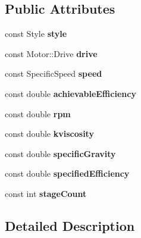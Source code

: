 \subsection*{Public Attributes}
\begin{DoxyCompactItemize}
\item 
\mbox{\label{struct_pump_1_1_input_aca184aaaa02b4e497dccec206f96a0d0}} 
const Style {\bfseries style}
\item 
\mbox{\label{struct_pump_1_1_input_ad14338611cfbf4fc0a0100d668c16f32}} 
const Motor\+::\+Drive {\bfseries drive}
\item 
\mbox{\label{struct_pump_1_1_input_a897d65dbfaddfd286aac0dd0dd88fcb6}} 
const Specific\+Speed {\bfseries speed}
\item 
\mbox{\label{struct_pump_1_1_input_a1c23f68e3a98975481a6f3c67c607a85}} 
const double {\bfseries achievable\+Efficiency}
\item 
\mbox{\label{struct_pump_1_1_input_a90b8725d1063cd958f89ed86ea174ab0}} 
const double {\bfseries rpm}
\item 
\mbox{\label{struct_pump_1_1_input_a7a1be3b4723aa2f49e5fdcbcc274d0c9}} 
const double {\bfseries kviscosity}
\item 
\mbox{\label{struct_pump_1_1_input_a1608eb0dfdd429df17ea7eddc55ccad7}} 
const double {\bfseries specific\+Gravity}
\item 
\mbox{\label{struct_pump_1_1_input_ab3b05426735a030d782ed1e7b41502c0}} 
const double {\bfseries specified\+Efficiency}
\item 
\mbox{\label{struct_pump_1_1_input_a0bb32e194fea939f8ef8cc74f6dccc4b}} 
const int {\bfseries stage\+Count}
\end{DoxyCompactItemize}


\subsection{Detailed Description}


